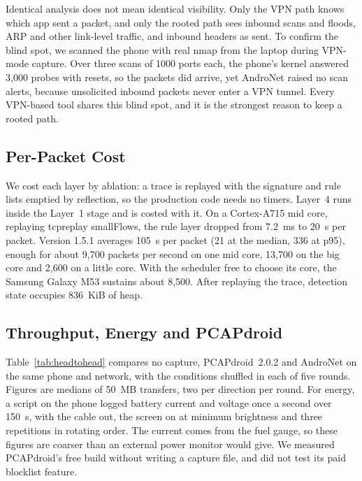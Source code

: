 \documentclass[runningheads]{llncs}
\begin{document}
Identical analysis does not mean identical visibility. Only the VPN path knows which app sent a packet, and only the rooted path sees inbound scans and floods, ARP and other link-level traffic, and inbound headers as sent. To confirm the blind spot, we scanned the phone with real nmap from the laptop during VPN-mode capture. Over three scans of 1000 ports each, the phone's kernel answered 3{,}000 probes with resets, so the packets did arrive, yet AndroNet raised no scan alerts, because unsolicited inbound packets never enter a VPN tunnel. Every VPN-based tool shares this blind spot, and it is the strongest reason to keep a rooted path.

\subsection{Per-Packet Cost}\label{sec:cost}

We cost each layer by ablation: a trace is replayed with the signature and rule lists emptied by reflection, so the production code needs no timers. Layer~4 runs inside the Layer~1 stage and is costed with it. On a Cortex-A715 mid core, replaying tcpreplay smallFlows, the rule layer dropped from 7.2~ms to 20~\textmu s per packet. Version 1.5.1 averages 105~\textmu s per packet (21 at the median, 336 at p95), enough for about 9{,}700 packets per second on one mid core, 13{,}700 on the big core and 2{,}600 on a little core. With the scheduler free to choose its core, the Samsung Galaxy M53 sustains about 8{,}500. After replaying the trace, detection state occupies 836~KiB of heap.

\subsection{Throughput, Energy and PCAPdroid}\label{sec:headtohead}

Table~\ref{tab:headtohead} compares no capture, PCAPdroid~2.0.2 and AndroNet on the same phone and network, with the conditions shuffled in each of five rounds. Figures are medians of 50~MB transfers, two per direction per round. For energy, a script on the phone logged battery current and voltage once a second over 150~s, with the cable out, the screen on at minimum brightness and three repetitions in rotating order. The current comes from the fuel gauge, so these figures are coarser than an external power monitor would give. We measured PCAPdroid's free build without writing a capture file, and did not test its paid blocklist feature.
\end{document}
